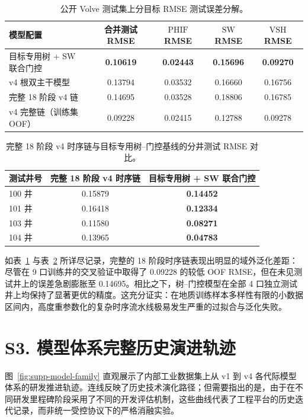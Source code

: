 \documentclass[preprint,12pt,nopreprintline]{elsarticle}
\begin{document}
\begin{table}[H]
\centering
\caption{公开 Volve 测试集上分目标 RMSE 测试误差分解。}
\label{tab:supp-v4-targets}
\small
\begin{tabular}{lcccc}
\toprule
模型配置 & 合并测试 RMSE & $\mathrm{PHIF}$ RMSE & $\mathrm{SW}$ RMSE & $\mathrm{VSH}$ RMSE \\
\midrule
目标专用树 + SW 联合门控 & \textbf{0.10619} & \textbf{0.02443} & \textbf{0.15696} & \textbf{0.09270} \\
v4 根双主干模型 & 0.13794 & 0.03532 & 0.16660 & 0.16756 \\
完整 18 阶段 v4 链 & 0.14695 & 0.03528 & 0.18806 & 0.16785 \\
v4 完整链（训练集 OOF） & 0.09228 & 0.02415 & 0.12788 & 0.09278 \\
\bottomrule
\end{tabular}
\end{table}

\begin{table}[H]
\centering
\caption{完整 18 阶段 v4 时序链与目标专用树--门控基线的分井测试 RMSE 对比。}
\label{tab:supp-v4-wells}
\small
\begin{tabular}{lcc}
\toprule
测试井号 & 完整 18 阶段 v4 时序链 & 目标专用树 + SW 联合门控 \\
\midrule
100 井 & 0.15879 & \textbf{0.14452} \\
101 井 & 0.16418 & \textbf{0.12334} \\
103 井 & 0.11580 & \textbf{0.08271} \\
104 井 & 0.13965 & \textbf{0.04783} \\
\bottomrule
\end{tabular}
\end{table}

如表~\ref{tab:supp-v4-targets} 与表~\ref{tab:supp-v4-wells} 所详尽记录，完整的 18 阶段时序链表现出明显的域外泛化差距：尽管在 9 口训练井的交叉验证中取得了 0.09228 的较低 OOF RMSE，但在未见测试井上的误差急剧膨胀至 0.14695。相比之下，树--门控模型在全部 4 口独立测试井上均保持了显著更优的精度。这充分证实：在地质训练样本多样性有限的小数据区间内，高度重参数化的复杂时序流水线极易发生严重的过拟合与泛化失败。

\section{S3. 模型体系完整历史演进轨迹}
\label{sec:supp-trajectory}
图~\ref{fig:supp-model-family} 直观展示了内部工业数据集上从 v1 到 v4 各代际模型体系的研发推进轨迹。连线反映了历史技术演化路径；但需要指出的是，由于在不同研发里程碑阶段采用了不同的开发评估机制，这些曲线代表了工程平台的历史迭代记录，而非统一受控协议下的严格消融实验。
\end{document}
